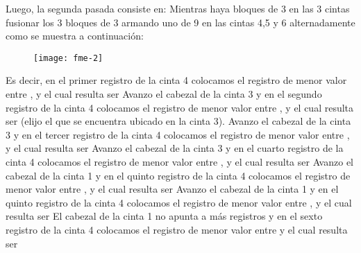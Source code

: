 \documentclass[10pt,a4paper]{article}
\begin{document}
Luego, la segunda pasada consiste en:
\newline
\newline
Mientras haya bloques de 3 en las 3 cintas fusionar los 3 bloques de 3 armando uno de 9 en las cintas 4,5 y 6 alternadamente como se muestra a continuación:
\newline
\newline
\begin{figure}[h]
	\centering
\texttt{[image: fme-2]}
	\label{drivers1}
\end{figure}
\newline
\newline
Es decir, en el primer registro de la cinta 4 colocamos el registro de menor valor entre ,  y  el cual resulta ser  
\newline
\newline
Avanzo el cabezal de la cinta 3 y en el segundo registro de la cinta 4 colocamos el registro de menor valor entre ,  y  el cual resulta ser  (elijo el que se encuentra ubicado en la cinta 3).
\newline
\newline
Avanzo el cabezal de la cinta 3 y en el tercer registro de la cinta 4 colocamos el registro de menor valor entre ,  y  el cual resulta ser 
\newline
\newline
Avanzo el cabezal de la cinta 3 y en el cuarto registro de la cinta 4 colocamos el registro de menor valor entre ,  y  el cual resulta ser 
\newline
\newline
Avanzo el cabezal de la cinta 1 y en el quinto registro de la cinta 4 colocamos el registro de menor valor entre ,  y  el cual resulta ser 
\newline
\newline
Avanzo el cabezal de la cinta 1 y en el quinto registro de la cinta 4 colocamos el registro de menor valor entre ,  y  el cual resulta ser 
\newline
\newline
El cabezal de la cinta 1 no apunta a más registros y en el sexto registro de la cinta 4 colocamos el registro de menor valor entre  y  el cual resulta ser 
\end{document}
